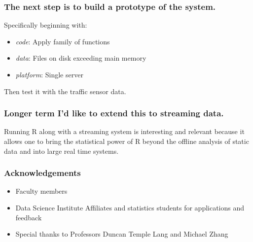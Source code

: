 \documentclass{beamer}
\begin{document}
\begin{frame}

    \frametitle{The next step is to build a prototype of the system.}

    Specifically beginning with:

\begin{itemize}
    \item \emph{code}: Apply family of functions
    \item \emph{data}: Files on disk exceeding main memory
    \item \emph{platform}: Single server
\end{itemize}

Then test it with the traffic sensor data.


\end{frame}
\begin{frame}

\frametitle{Longer term I'd like to extend this to streaming data.}


Running R along with a streaming system is
interesting and relevant because it allows one to bring the statistical
power of R beyond the offline analysis of static data and into large real
time systems. 

\end{frame}
\begin{frame}

    \frametitle{Acknowledgements}

\begin{itemize}
    \item Faculty members
    \item Data Science Institute Affiliates and statistics students for
        applications and feedback
    \item Special thanks to Professors Duncan Temple Lang and Michael Zhang
\end{itemize}

\end{frame}
\end{document}
